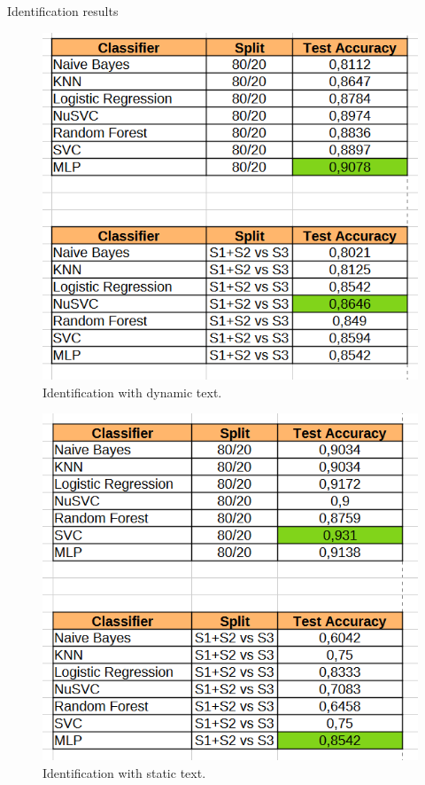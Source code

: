 \documentclass[12pt]{report}
\begin{document}
\begin{table}[htbp]
    \centering
    \caption{Identification results}
    \begin{subfigure}[t]{0.49\textwidth}
        \centering
        \includegraphics[width=\linewidth]{Images/Results/Static_Dynamic/id_moving.png}
        \caption{Identification with dynamic text.}
        \label{tab:dyn_id}
    \end{subfigure}
    \hfill
    \begin{subfigure}[t]{0.49\textwidth}
        \centering
        \includegraphics[width=\linewidth]{Images/Results/Static_Dynamic/id_stat.png}
        \caption{Identification with static text.}
        \label{tab:stat_id}
    \end{subfigure}
\end{table}
\end{document}
